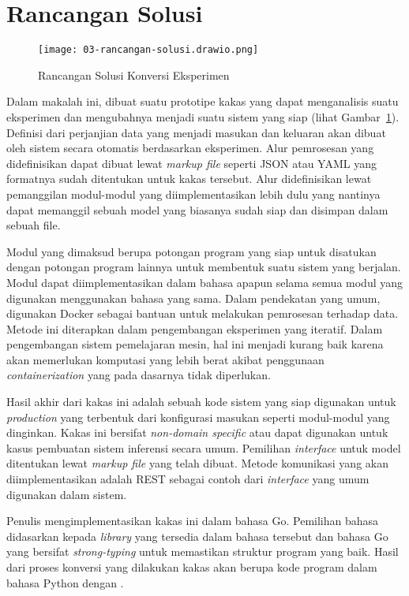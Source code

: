 \section{Rancangan Solusi}

\begin{figure}[ht]
  \centering
  \texttt{[image: 03-rancangan-solusi.drawio.png]}
  \caption{Rancangan Solusi Konversi Eksperimen}\label{fig:03-tool}
\end{figure}

Dalam makalah ini, dibuat suatu prototipe kakas yang dapat menganalisis suatu eksperimen dan mengubahnya menjadi suatu sistem yang siap (lihat Gambar~\ref{fig:03-tool}).
Definisi dari perjanjian data yang menjadi masukan dan keluaran akan dibuat oleh sistem secara otomatis berdasarkan eksperimen.
Alur pemrosesan yang didefinisikan dapat dibuat lewat \textit{markup file} seperti JSON atau YAML yang formatnya sudah ditentukan untuk kakas tersebut.
Alur didefinisikan lewat pemanggilan modul-modul yang diimplementasikan lebih dulu yang nantinya dapat memanggil sebuah model yang biasanya sudah siap dan disimpan dalam sebuah file.

Modul yang dimaksud berupa potongan program yang siap untuk disatukan dengan potongan program lainnya untuk membentuk suatu sistem yang berjalan.
Modul dapat diimplementasikan dalam bahasa apapun selama semua modul yang digunakan menggunakan bahasa yang sama.
Dalam pendekatan yang umum, digunakan Docker sebagai bantuan untuk melakukan pemrosesan terhadap data.
Metode ini diterapkan dalam pengembangan eksperimen yang iteratif.
Dalam pengembangan sistem pemelajaran mesin, hal ini menjadi kurang baik karena akan memerlukan komputasi yang lebih berat akibat penggunaan \textit{containerization} yang pada dasarnya tidak diperlukan.

Hasil akhir dari kakas ini adalah sebuah kode sistem yang siap digunakan untuk \textit{production} yang terbentuk dari konfigurasi masukan seperti modul-modul yang dinginkan.
Kakas ini bersifat \textit{non-domain specific} atau dapat digunakan untuk kasus pembuatan sistem inferensi secara umum.
Pemilihan \textit{interface} untuk model ditentukan lewat \textit{markup file} yang telah dibuat.
Metode komunikasi yang akan diimplementasikan adalah REST sebagai contoh dari \textit{interface} yang umum digunakan dalam sistem.

Penulis mengimplementasikan kakas ini dalam bahasa Go.
Pemilihan bahasa didasarkan kepada \textit{library} yang tersedia dalam bahasa tersebut dan bahasa Go yang bersifat \textit{strong-typing} untuk memastikan struktur program yang baik.
Hasil dari proses konversi yang dilakukan kakas akan berupa kode program dalam bahasa Python dengan .


